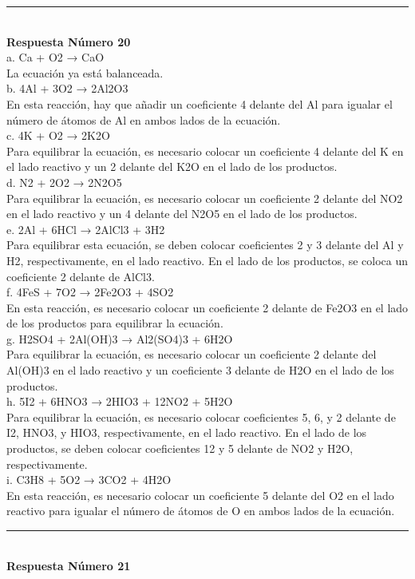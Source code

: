 \documentclass{article}
\begin{document}
\noindent\rule{\textwidth}{1pt} \\
\textbf{Respuesta Número 20} \\
a. Ca + O2 → CaO\\
   La ecuación ya está balanceada.\\
b. 4Al + 3O2 → 2Al2O3\\
   En esta reacción, hay que añadir un coeficiente 4 delante del Al para igualar el número de átomos de Al en ambos lados de la ecuación.\\
c. 4K + O2 → 2K2O\\
   Para equilibrar la ecuación, es necesario colocar un coeficiente 4 delante del K en el lado reactivo y un 2 delante del K2O en el lado de los productos.\\
d. N2 + 2O2 → 2N2O5\\
   Para equilibrar la ecuación, es necesario colocar un coeficiente 2 delante del NO2 en el lado reactivo y un 4 delante del N2O5 en el lado de los productos.\\
e. 2Al + 6HCl → 2AlCl3 + 3H2\\
   Para equilibrar esta ecuación, se deben colocar coeficientes 2 y 3 delante del Al y H2, respectivamente, en el lado reactivo. En el lado de los productos, se coloca un coeficiente 2 delante de AlCl3.\\
f. 4FeS + 7O2 → 2Fe2O3 + 4SO2\\
   En esta reacción, es necesario colocar un coeficiente 2 delante de Fe2O3 en el lado de los productos para equilibrar la ecuación.\\
g. H2SO4 + 2Al(OH)3 → Al2(SO4)3 + 6H2O\\
   Para equilibrar la ecuación, es necesario colocar un coeficiente 2 delante del Al(OH)3 en el lado reactivo y un coeficiente 3 delante de H2O en el lado de los productos.\\
h. 5I2 + 6HNO3 → 2HIO3 + 12NO2 + 5H2O\\
   Para equilibrar la ecuación, es necesario colocar coeficientes 5, 6, y 2 delante de I2, HNO3, y HIO3, respectivamente, en el lado reactivo. En el lado de los productos, se deben colocar coeficientes 12 y 5 delante de NO2 y H2O, respectivamente.\\
i. C3H8 + 5O2 → 3CO2 + 4H2O\\
   En esta reacción, es necesario colocar un coeficiente 5 delante del O2 en el lado reactivo para igualar el número de átomos de O en ambos lados de la ecuación.\\
\noindent\rule{\textwidth}{1pt} \\
\textbf{Respuesta Número 21} \\
\end{document}
